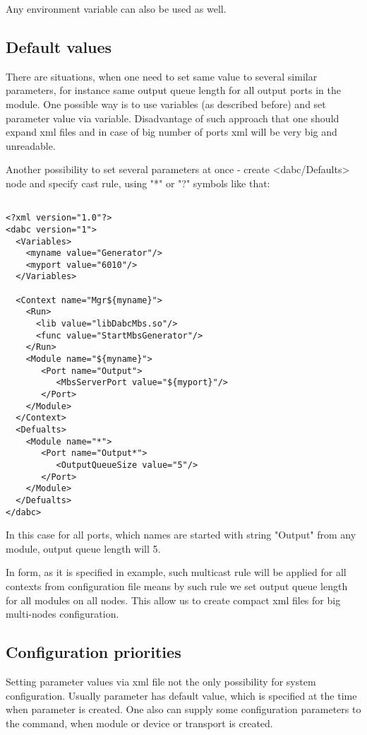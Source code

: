 Any environment variable can also be used as well. 


\subsection{Default values}

There are situations, when one need to set same value to several similar parameters,
for instance same output queue length for all output ports in the module. One possible way
is to use variables (as described before) and set parameter value via variable. 
Disadvantage of such approach that one should expand xml files and in case 
of big number of ports xml will be very big and unreadable.

Another possibility to set several parameters at once - create <dabc/Defaults> node and
specify cast rule, using "*" or "?" symbols like that: 

\begin{verbatim}

<?xml version="1.0"?>
<dabc version="1">
  <Variables>
    <myname value="Generator"/> 
    <myport value="6010"/> 
  </Variables>

  <Context name="Mgr${myname}">
    <Run>
      <lib value="libDabcMbs.so"/>
      <func value="StartMbsGenerator"/>
    </Run>
    <Module name="${myname}">
       <Port name="Output">
          <MbsServerPort value="${myport}"/>
       </Port>
    </Module>
  </Context>
  <Defualts>
    <Module name="*">
       <Port name="Output*">
          <OutputQueueSize value="5"/>
       </Port>
    </Module>
  </Defualts>
</dabc>

\end{verbatim}

In this case for all ports, which names are started with string "Output" from any module,
output queue length will 5. 

In form, as it is specified in example, such multicast rule will be applied for 
all contexts from configuration file means by such rule we set output queue length 
for all modules on all nodes. This allow us to create compact xml files for big multi-nodes configuration.   


\subsection{Configuration priorities}

Setting parameter values via xml file not the only possibility for system configuration. 
Usually parameter has default value, which is specified at the time when parameter is created.
One also can supply some configuration parameters to the command, when module or device or transport is created.

